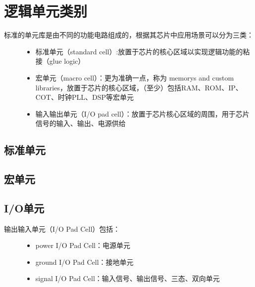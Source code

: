 \documentclass[letterpaper,10pt,english]{sphinxmanual}
\begin{document}
\section{逻辑单元类别}
\label{\detokenize{chapter2/_u5355_u5143_u5e93_u7c7b_u522b:id1}}\label{\detokenize{chapter2/_u5355_u5143_u5e93_u7c7b_u522b::doc}}\begin{description}
\item[{标准的单元库是由不同的功能电路组成的，根据其芯片中应用场景可以分为三类：}] \leavevmode\begin{itemize}
\item {} 
\sphinxAtStartPar
标准单元（standard cell）:放置于芯片的核心区域以实现逻辑功能的粘接（glue logic）

\item {} 
\sphinxAtStartPar
宏单元（macro cell）：更为准确一点，称为 memorys and custom libraries，放置于芯片的核心区域，（至少）包括RAM、ROM、IP、COT、时钟PLL、DSP等宏单元

\item {} 
\sphinxAtStartPar
输入输出单元（I/O pad cell）：放置于芯片核心区域的周围，用于芯片信号的输入、输出、电源供给

\end{itemize}

\end{description}

\begin{figure}[htbp]
\centering

\noindent{}
\end{figure}


\subsection{标准单元}
\label{\detokenize{chapter2/_u5355_u5143_u5e93_u7c7b_u522b:id2}}

\subsection{宏单元}
\label{\detokenize{chapter2/_u5355_u5143_u5e93_u7c7b_u522b:id3}}

\subsection{I/O单元}
\label{\detokenize{chapter2/_u5355_u5143_u5e93_u7c7b_u522b:i-o}}\begin{description}
\item[{输出输入单元（I/O Pad Cell）包括：}] \leavevmode\begin{itemize}
\item {} 
\sphinxAtStartPar
power I/O Pad Cell：电源单元

\item {} 
\sphinxAtStartPar
ground I/O Pad Cell：接地单元

\item {} 
\sphinxAtStartPar
signal I/O Pad Cell：输入信号、输出信号、三态、双向单元

\end{itemize}

\end{description}
\end{document}
